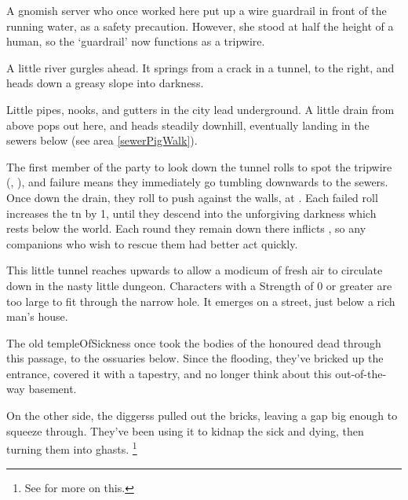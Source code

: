 \begin{multicols}{2}

\begin{exampletext}
  A gnomish \gls{server} who once worked here put up a wire guardrail in front of the running water, as a safety precaution.
  However, she stood at half the height of a human, so the `guardrail' now functions as a tripwire.
\end{exampletext}

\begin{boxtext}
  A little river gurgles ahead.
  It springs from a crack in a tunnel, to the right, and heads down a greasy slope into darkness.
\end{boxtext}

Little pipes, nooks, and gutters in the city lead underground.
A little drain from above pops out here, and heads steadily downhill, eventually landing in the sewers below (see area \vref{sewerPigWalk}).

The first member of the party to look down the tunnel rolls to spot the tripwire (, \tn[8]), and failure means they immediately go tumbling downwards to the sewers.
Once down the drain, they roll  to push against the walls, at \tn[9].
Each failed roll increases the \gls{tn} by 1, until they descend into the unforgiving darkness which rests below the world.
Each round they remain down there inflicts , so any companions who wish to rescue them had better act quickly.


This little tunnel reaches upwards to allow a modicum of fresh air to circulate down in the nasty little dungeon.
Characters with a Strength of 0 or greater are too large to fit through the narrow hole.
It emerges on a street, just below a rich man's house.


\begin{exampletext}
  The old \gls{templeOfSickness} once took the bodies of the honoured dead through this passage, to the ossuaries below.
  Since the flooding, they've bricked up the entrance, covered it with a tapestry, and no longer think about this out-of-the-way basement.

  On the other side, the \glspl{diggers} pulled out the bricks, leaving a gap big enough to squeeze through.
  They've been using it to kidnap the sick and dying, then turning them into ghasts.%
  \footnote{See  for more on this.}
\end{exampletext}


\end{multicols}
